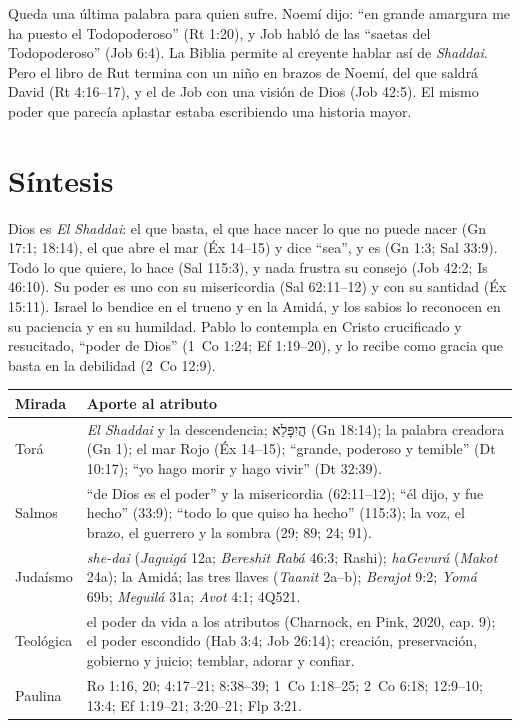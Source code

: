\documentclass[11pt,letterpaper]{article}
\newcommand{\heb}[1]{\mbox{\foreignlanguage{hebrew}{#1}}}
\begin{document}
Queda una última palabra para quien sufre. Noemí dijo: ``en grande amargura me ha puesto el Todopoderoso'' (Rt 1:20), y Job habló de las ``saetas del Todopoderoso'' (Job 6:4). La Biblia permite al creyente hablar así de \emph{Shaddai}. Pero el libro de Rut termina con un niño en brazos de Noemí, del que saldrá David (Rt 4:16--17), y el de Job con una visión de Dios (Job 42:5). El mismo poder que parecía aplastar estaba escribiendo una historia mayor.

\section{Síntesis}

\begin{center}
\begin{tcolorbox}[colback=papiro,colframe=azul,boxrule=1pt,arc=3pt,width=0.95\linewidth]
Dios es \emph{El Shaddai}: el que basta, el que hace nacer lo que no puede nacer (Gn 17:1; 18:14), el que abre el mar (Éx 14--15) y dice ``sea'', y es (Gn 1:3; Sal 33:9). Todo lo que quiere, lo hace (Sal 115:3), y nada frustra su consejo (Job 42:2; Is 46:10). Su poder es uno con su misericordia (Sal 62:11--12) y con su santidad (Éx 15:11). Israel lo bendice en el trueno y en la Amidá, y los sabios lo reconocen en su paciencia y en su humildad. Pablo lo contempla en Cristo crucificado y resucitado, ``poder de Dios'' (1~Co 1:24; Ef 1:19--20), y lo recibe como gracia que basta en la debilidad (2~Co 12:9).
\end{tcolorbox}
\end{center}

\begin{center}\small\renewcommand{\arraystretch}{1.25}
\begin{tabular}{@{}L{2.6cm}L{11.8cm}@{}}
\toprule
\textbf{Mirada} & \textbf{Aporte al atributo} \\ \midrule
Torá & \emph{El Shaddai} y la descendencia; \heb{הֲיִפָּלֵא} (Gn 18:14); la palabra creadora (Gn 1); el mar Rojo (Éx 14--15); ``grande, poderoso y temible'' (Dt 10:17); ``yo hago morir y hago vivir'' (Dt 32:39). \\
Salmos & ``de Dios es el poder'' y la misericordia (62:11--12); ``él dijo, y fue hecho'' (33:9); ``todo lo que quiso ha hecho'' (115:3); la voz, el brazo, el guerrero y la sombra (29; 89; 24; 91). \\
Judaísmo & \emph{she-dai} (\emph{Jaguigá} 12a; \emph{Bereshit Rabá} 46:3; Rashi); \emph{haGevurá} (\emph{Makot} 24a); la Amidá; las tres llaves (\emph{Taanit} 2a--b); \emph{Berajot} 9:2; \emph{Yomá} 69b; \emph{Meguilá} 31a; \emph{Avot} 4:1; 4Q521. \\
Teológica & el poder da vida a los atributos (Charnock, en Pink, 2020, cap. 9); el poder escondido (Hab 3:4; Job 26:14); creación, preservación, gobierno y juicio; temblar, adorar y confiar. \\
Paulina & Ro 1:16, 20; 4:17--21; 8:38--39; 1~Co 1:18--25; 2~Co 6:18; 12:9--10; 13:4; Ef 1:19--21; 3:20--21; Flp 3:21. \\
\bottomrule
\end{tabular}\end{center}
\end{document}
